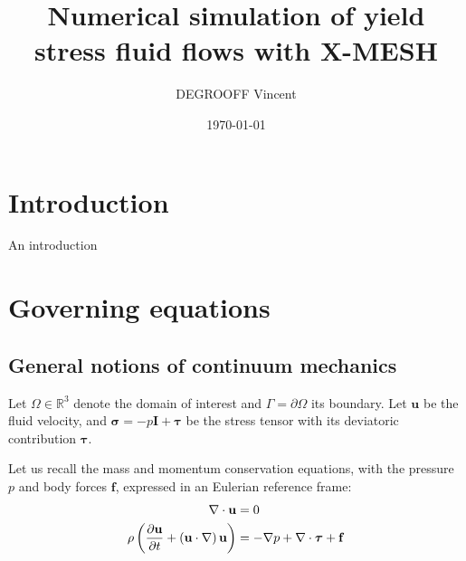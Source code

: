 \documentclass[11 pt]{report}
\title{{\Huge Numerical simulation of yield stress fluid flows with X-MESH}}
\author{\textsc{DEGROOFF} Vincent}
\date{\today}
\begin{document}
 
%
\maketitle

\setcounter{tocdepth}{1}
\tableofcontents



\chapter*{Introduction}
An introduction

\chapter{Governing equations}

\section{General notions of continuum mechanics}
Let $\Omega \in \mathbb{R}^3$ denote the domain of interest and $\Gamma=\partial \Omega$ its boundary. Let $\mathbf{u}$ be the fluid velocity, and $\boldsymbol{\sigma}=-p\mathbf{I}+\boldsymbol{\tau}$ be the stress tensor with its deviatoric contribution $\boldsymbol\tau$.

Let us recall the mass and momentum conservation equations, with the pressure $p$ and body forces $\mathbf{f}$, expressed in an Eulerian reference frame:
\begin{align}
    \nabla \cdot \mathbf{u} &= 0\\
    \rho \left(\pdv{\mathbf{u}}{t} + \left(\mathbf{u} \cdot \nabla\right) \mathbf{u}\right) &= -\nabla p + \nabla \cdot \boldsymbol\tau + \mathbf{f}
\end{align}

\end{document}
